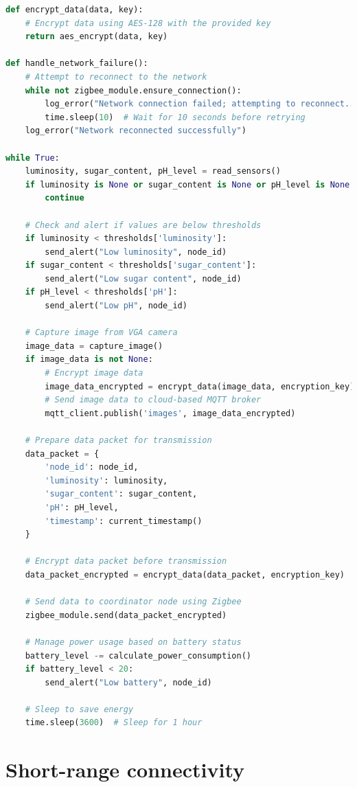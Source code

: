 \documentclass{article}
\begin{document}
\begin{enumerate}
\begin{lstlisting}[language=Python]
def encrypt_data(data, key):
    # Encrypt data using AES-128 with the provided key
    return aes_encrypt(data, key)

def handle_network_failure():
    # Attempt to reconnect to the network
    while not zigbee_module.ensure_connection():
        log_error("Network connection failed; attempting to reconnect...")
        time.sleep(10)  # Wait for 10 seconds before retrying
    log_error("Network reconnected successfully")

while True:
    luminosity, sugar_content, pH_level = read_sensors()
    if luminosity is None or sugar_content is None or pH_level is None:
        continue

    # Check and alert if values are below thresholds
    if luminosity < thresholds['luminosity']:
        send_alert("Low luminosity", node_id)
    if sugar_content < thresholds['sugar_content']:
        send_alert("Low sugar content", node_id)
    if pH_level < thresholds['pH']:
        send_alert("Low pH", node_id)

    # Capture image from VGA camera
    image_data = capture_image()
    if image_data is not None:
        # Encrypt image data
        image_data_encrypted = encrypt_data(image_data, encryption_key)
        # Send image data to cloud-based MQTT broker
        mqtt_client.publish('images', image_data_encrypted)

    # Prepare data packet for transmission
    data_packet = {
        'node_id': node_id,
        'luminosity': luminosity,
        'sugar_content': sugar_content,
        'pH': pH_level,
        'timestamp': current_timestamp()
    }

    # Encrypt data packet before transmission
    data_packet_encrypted = encrypt_data(data_packet, encryption_key)

    # Send data to coordinator node using Zigbee
    zigbee_module.send(data_packet_encrypted)

    # Manage power usage based on battery status
    battery_level -= calculate_power_consumption()
    if battery_level < 20:
        send_alert("Low battery", node_id)

    # Sleep to save energy
    time.sleep(3600)  # Sleep for 1 hour
\end{lstlisting}

\end{enumerate}

\newpage

\section{Short-range connectivity}
\end{document}
